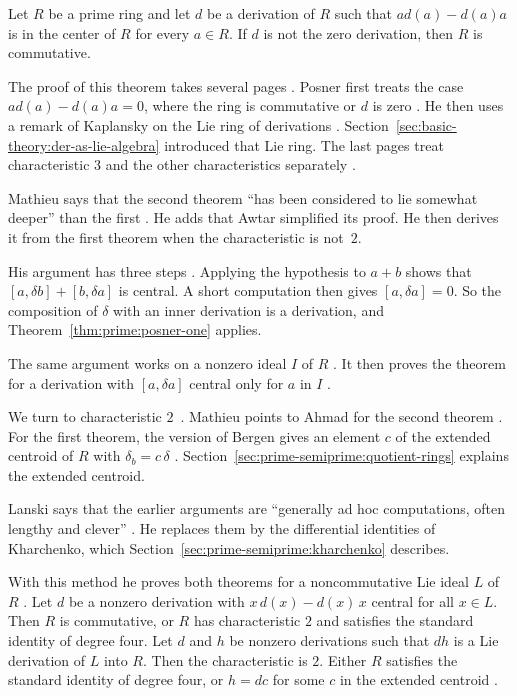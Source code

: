 \begin{theorem}\label{thm:prime:posner-two}
Let $R$ be a prime ring and let $d$ be a derivation of $R$ such that
$ad(a)-d(a)a$ is in the center of $R$ for every $a\in R$. If $d$ is not the
zero derivation, then $R$ is commutative.
\end{theorem}

The proof of this theorem takes several pages
\cite[pp.~1094--1100]{Posner1957}. Posner first treats the case
$ad(a)-d(a)a=0$, where the ring is commutative or $d$ is zero \cite[Lemma~3,
pp.~1094--1095]{Posner1957}. He then uses a remark of Kaplansky on the Lie
ring of derivations \cite[Lemma~4, pp.~1096--1097]{Posner1957}.
Section~\ref{sec:basic-theory:der-as-lie-algebra} introduced that Lie ring.
The last pages treat characteristic $3$ and the other characteristics
separately \cite[pp.~1097--1100]{Posner1957}.

Mathieu says that the second theorem ``has been considered to lie somewhat
deeper'' than the first \cite[p.~601]{Mathieu1992}. He adds that Awtar
simplified its proof. He then derives it from the first theorem when the
characteristic is not~$2$.

His argument has three steps \cite[pp.~601--602]{Mathieu1992}. Applying the
hypothesis to $a+b$ shows that $[a,\delta b]+[b,\delta a]$ is central. A short
computation then gives $[a,\delta a]=0$. So the composition of $\delta$ with
an inner derivation is a derivation, and Theorem~\ref{thm:prime:posner-one}
applies.

The same argument works on a nonzero ideal $I$ of $R$
\cite[p.~601]{Mathieu1992}. It then proves the theorem for a derivation with
$[a,\delta a]$ central only for $a$ in $I$ \cite[p.~601]{Mathieu1992}.

We turn to characteristic $2$~\cite[Remark~2, p.~602]{Mathieu1992}. Mathieu points to Ahmad for the second theorem
\cite[pp.~601--602]{Mathieu1992}. For the first theorem, the version of Bergen
gives an element $c$ of the extended centroid of $R$ with $\delta_b=c\,\delta$
\cite[Remark~2, p.~602]{Mathieu1992}.
Section~\ref{sec:prime-semiprime:quotient-rings} explains the extended
centroid.

Lanski says that the earlier arguments are ``generally ad hoc computations,
often lengthy and clever'' \cite[p.~276]{Lanski1988}. He replaces them by the
differential identities of Kharchenko, which
Section~\ref{sec:prime-semiprime:kharchenko} describes.

With this method he proves both theorems for a noncommutative Lie ideal $L$ of
$R$ \cite[p.~276]{Lanski1988}. Let $d$ be a nonzero derivation with
$x\,d(x)-d(x)\,x$ central for all $x\in L$. Then $R$ is commutative, or $R$
has characteristic $2$ and satisfies the standard identity of degree four. Let
$d$ and $h$ be nonzero derivations such that $dh$ is a Lie derivation of $L$
into $R$. Then the characteristic is $2$. Either $R$ satisfies the standard
identity of degree four, or $h=dc$ for some $c$ in the extended centroid
\cite[p.~276]{Lanski1988}.

